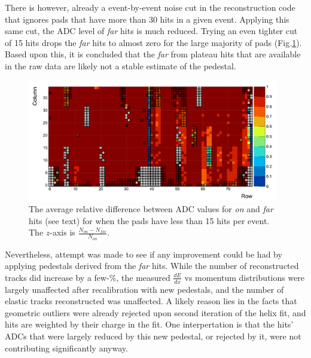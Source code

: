 \documentclass[amsmath,amssymb,notitlepage,12pt]{revtex4-1}
\begin{document}
There is however, already a event-by-event noise cut in the reconstruction code that ignores pads that have more than 30 hits in a given event.  Applying this same cut, the ADC level of {\it far} hits is much reduced.  Trying an even tighter cut of 15 hits drops the {\it far} hits to almost zero for the large majority of pads (Fig.\ref{fig:relped}).  Based upon this, it is concluded that the {\it far} from plateau hits that are available in the raw data are likely not a stable estimate of the pedestal.

\begin{figure}[htbp]\centering
    \includegraphics[width=11cm]{Eg6rtpc_pedestal_NEW15_small.png}
    \caption{The average relative difference between ADC values for {\it on} and {\it far} hits (see text) for when the pads have less than 15 hits per event.  The $z$-axis is $\frac{N_{on}-N_{far}}{N_{on}}$.\label{fig:relped}}
\end{figure}

Nevertheless, attempt was made to see if any improvement could be had by applying pedestals derived from the {\it far} hits.  While the number of reconstructed tracks did increase by a few-\%, the measured $\frac{dE}{dx}$ vs momentum distributions were largely unaffected after recalibration with new pedestals, and the number of elastic tracks reconstructed was unaffected.  A likely reason lies in the facts that geometric outliers were already rejected upon second iteration of the helix fit, and hits are weighted by their charge in the fit.  One interpertation is that the hits' ADCs that were largely reduced by this new pedestal, or rejected by it, were not contributing significantly anyway.
\end{document}
